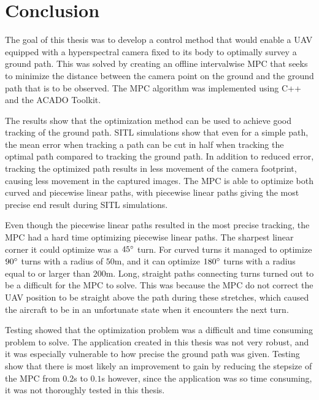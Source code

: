 \chapter{Conclusion}

The goal of this thesis was to develop a control method that would enable a UAV equipped with a hyperspectral camera fixed to its body to optimally survey a ground path. This was solved by creating an offline intervalwise MPC that seeks to minimize the distance between the camera point on the ground and the ground path that is to be observed. The MPC algorithm was implemented using C++ and the ACADO Toolkit.

The results show that the optimization method can be used to achieve good tracking of the ground path. SITL simulations show that even for a simple path, the mean error when tracking a path can be cut in half when tracking the optimal path compared to tracking the ground path. In addition to reduced error, tracking the optimized path results in less movement of the camera footprint, causing less movement in the captured images. The MPC is able to optimize both curved and piecewise linear paths, with piecewise linear paths giving the most precise end result during SITL simulations.

Even though the piecewise linear paths resulted in the most precise tracking, the MPC had a hard time optimizing piecewise linear paths. The sharpest linear corner it could optimize was a $45\degree$ turn. For curved turns it managed to optimize $90\degree$ turns with a radius of $50$m, and it can optimize $180\degree$ turns with a radius equal to or larger than $200$m. Long, straight paths connecting turns turned out to be a difficult for the MPC to solve. This was because the MPC do not correct the UAV position to be straight above the path during these stretches, which caused the aircraft to be in an unfortunate state when it encounters the next turn.

Testing showed that the optimization problem was a difficult and time consuming problem to solve. The application created in this thesis was not very robust, and it was especially vulnerable to how precise the ground path was given. Testing show that there is most likely an improvement to gain by reducing the stepsize of the MPC from $0.2$s to $0.1$s however, since the application was so time consuming, it was not thoroughly tested in this thesis.


